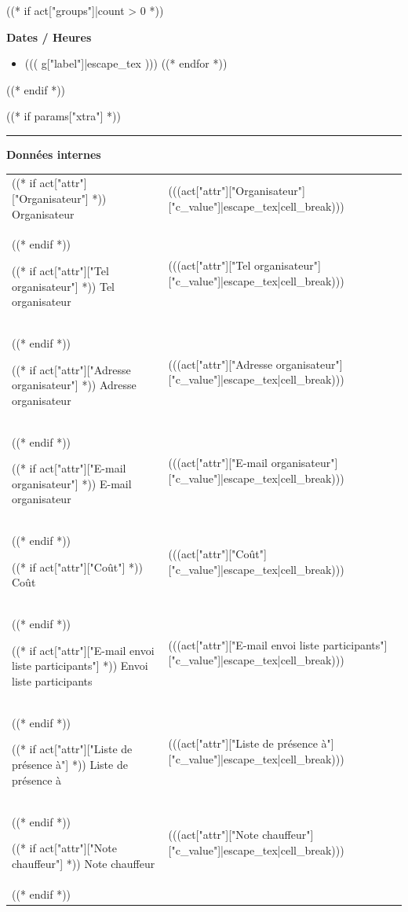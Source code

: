 \documentclass [parskip=full, paper=a4paper]{scrbook}
\begin{document}
\begin{minipage}[t]{\textwidth}
((* if act["groups"]|count > 0 *))
\medskip

\textbf{Dates / Heures}
\medskip

\begin{itemize}[noitemsep]
((* for g in act["groups"] *))
\item ((( g["label"]|escape_tex )))
((* endfor *))
\end{itemize}
((* endif *))

((* if params["xtra"] *))
\rule{\textwidth}{1pt}

\medskip

\textbf{Données internes}
\medskip

\begin{tabulary}{0.9\textwidth}{p{4cm}|L}
((* if act["attr"]["Organisateur"] *))
Organisateur & (((act["attr"]["Organisateur"]["c_value"]|escape_tex|cell_break))) \\
((* endif *))

((* if act["attr"]["Tel organisateur"] *))
Tel organisateur & (((act["attr"]["Tel organisateur"]["c_value"]|escape_tex|cell_break))) \\
((* endif *))

((* if act["attr"]["Adresse organisateur"] *))
Adresse organisateur & (((act["attr"]["Adresse organisateur"]["c_value"]|escape_tex|cell_break))) \\
((* endif *))

((* if act["attr"]["E-mail organisateur"] *))
E-mail organisateur & (((act["attr"]["E-mail organisateur"]["c_value"]|escape_tex|cell_break))) \\
((* endif *))

((* if act["attr"]["Coût"] *))
Coût & (((act["attr"]["Coût"]["c_value"]|escape_tex|cell_break))) \\
((* endif *))

((* if act["attr"]["E-mail envoi liste participants"] *))
Envoi liste participants & (((act["attr"]["E-mail envoi liste participants"]["c_value"]|escape_tex|cell_break))) \\
((* endif *))

((* if act["attr"]["Liste de présence à"] *))
Liste de présence à & (((act["attr"]["Liste de présence à"]["c_value"]|escape_tex|cell_break))) \\
((* endif *))

((* if act["attr"]["Note chauffeur"] *))
Note chauffeur & (((act["attr"]["Note chauffeur"]["c_value"]|escape_tex|cell_break))) \\
((* endif *))


\end{tabulary}
\end{minipage}
\end{document}
